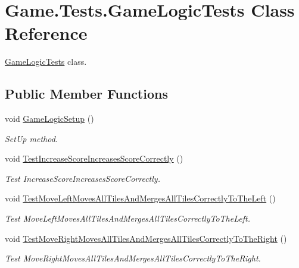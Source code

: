 \hypertarget{class_game_1_1_tests_1_1_game_logic_tests}{}\section{Game.\+Tests.\+Game\+Logic\+Tests Class Reference}
\label{class_game_1_1_tests_1_1_game_logic_tests}


\mbox{\hyperlink{class_game_1_1_tests_1_1_game_logic_tests}{Game\+Logic\+Tests}} class.  


\subsection*{Public Member Functions}
\begin{DoxyCompactItemize}
\item 
void \mbox{\hyperlink{class_game_1_1_tests_1_1_game_logic_tests_a61fea100641f1e24608112d1d6a8f18b}{Game\+Logic\+Setup}} ()
\begin{DoxyCompactList}\small\item\em Set\+Up method. \end{DoxyCompactList}\item 
void \mbox{\hyperlink{class_game_1_1_tests_1_1_game_logic_tests_aff90c0279e1df2707165537b92c63e43}{Test\+Increase\+Score\+Increases\+Score\+Correctly}} ()
\begin{DoxyCompactList}\small\item\em Test Increase\+Score\+Increases\+Score\+Correctly. \end{DoxyCompactList}\item 
void \mbox{\hyperlink{class_game_1_1_tests_1_1_game_logic_tests_a1e37c104df375a24cf3534a88612aff2}{Test\+Move\+Left\+Moves\+All\+Tiles\+And\+Merges\+All\+Tiles\+Correctly\+To\+The\+Left}} ()
\begin{DoxyCompactList}\small\item\em Test Move\+Left\+Moves\+All\+Tiles\+And\+Merges\+All\+Tiles\+Correctly\+To\+The\+Left. \end{DoxyCompactList}\item 
void \mbox{\hyperlink{class_game_1_1_tests_1_1_game_logic_tests_a731ffb5af77dc171515b6a6399f937a4}{Test\+Move\+Right\+Moves\+All\+Tiles\+And\+Merges\+All\+Tiles\+Correctly\+To\+The\+Right}} ()
\begin{DoxyCompactList}\small\item\em Test Move\+Right\+Moves\+All\+Tiles\+And\+Merges\+All\+Tiles\+Correctly\+To\+The\+Right. \end{DoxyCompactList}\item 

\end{DoxyCompactItemize}
